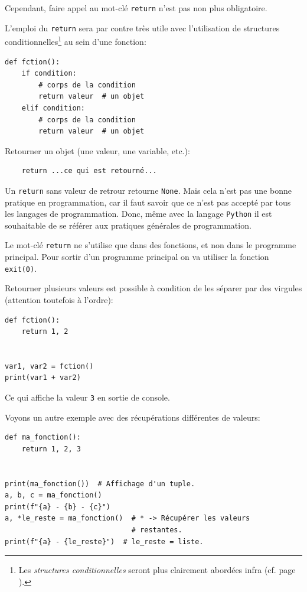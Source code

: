 \documentclass[a4paper,11pt]{book}
\begin{document}
Cependant, faire appel au mot-clé \texttt{return} n'est pas non plus obligatoire.
\medskip

L'emploi du \texttt{return} sera par contre très utile avec l'utilisation de structures conditionnelles\footnote{Les \textit{structures conditionnelles} seront plus clairement abordées infra (cf. page \pageref{struct_cond}).} au sein d'une fonction:
\begin{lstlisting}[caption=Retours de fonction et structures conditionnelles]
def fction():
    if condition:
        # corps de la condition
        return valeur  # un objet
    elif condition:
        # corps de la condition
        return valeur  # un objet
\end{lstlisting}
\medskip

Retourner un objet (une valeur, une variable, etc.):
\begin{verbatim}
    return ...ce qui est retourné...
\end{verbatim}
\medskip

Un \texttt{return} sans valeur de retrour retourne \texttt{None}. Mais cela n'est pas une bonne pratique en programmation, car il faut savoir que ce n'est pas accepté par tous les langages de programmation. Donc, même avec la langage \texttt{Python} il est souhaitable de se référer aux pratiques générales de programmation.
\medskip

Le mot-clé \texttt{return} ne s'utilise que dans des fonctions, et non dans le programme principal. Pour sortir d'un programme principal on va utiliser la fonction \texttt{exit(0)}.
\medskip

Retourner plusieurs valeurs est possible à condition de les séparer par des virgules (attention toutefois à l'ordre):
\begin{lstlisting}[caption=Fonction retournant plusieurs objets]
def fction():
    return 1, 2


var1, var2 = fction()
print(var1 + var2)
\end{lstlisting}
\medskip

Ce qui affiche la valeur \texttt{3} en sortie de console.
\medskip

Voyons un autre exemple avec des récupérations différentes de valeurs:
\begin{lstlisting}[caption=Récupération de plusieurs valeurs de retour]
def ma_fonction():
    return 1, 2, 3


print(ma_fonction())  # Affichage d'un tuple.
a, b, c = ma_fonction()
print(f"{a} - {b} - {c}")
a, *le_reste = ma_fonction()  # * -> Récupérer les valeurs 
                              # restantes.
print(f"{a} - {le_reste}")  # le_reste = liste.
\end{lstlisting}
\medskip
\end{document}
